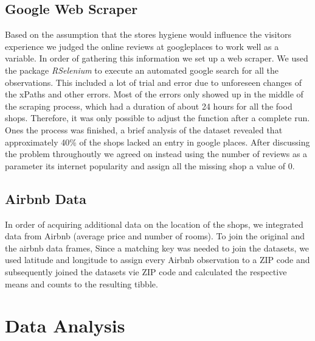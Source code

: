 \documentclass[11pt]{article}
\begin{document}
\subsection{Google Web Scraper}

Based on the assumption that the stores hygiene would influence the visitors experience we judged the online reviews at googleplaces to work well as a variable. In order of gathering this information we set up a web scraper. We used the package \textit{RSelenium} to execute an automated google search for all the observations. This included a lot of trial and error due to unforeseen changes of the xPaths and other errors. Most of the errors only showed up in the middle of the scraping process, which had a duration of about 24 hours for all the food shops. Therefore, it was only possible to adjust the function after a complete run.\\

Ones the process was finished, a brief analysis of the dataset revealed that approximately 40\% of the shops lacked an entry in google places. After discussing the problem throughoutly we agreed on instead using the number of reviews as a parameter its internet popularity and assign all the missing shop a value of $0$. 

\subsection{Airbnb Data}

In order of acquiring additional data on the location of the shops, we integrated data from Airbnb (average price and number of rooms). To join the original and the airbnb data frames, Since a matching key was needed to join the datasets, we used latitude and longitude to assign every Airbnb observation to a ZIP code and subsequently joined the datasets vie ZIP code and calculated the respective means and counts to the resulting tibble.

\section{Data Analysis}
\end{document}
